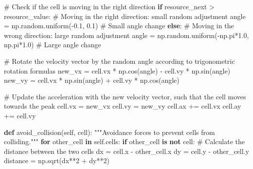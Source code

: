 \documentclass[
  letterpaper,
  DIV=11,
  numbers=noendperiod]{scrreprt}
\newenvironment{Shaded}{\begin{snugshade}}{\end{snugshade}}
\newcommand{\CommentTok}[1]{\textcolor[rgb]{0.37,0.37,0.37}{#1}}
\newcommand{\ControlFlowTok}[1]{\textcolor[rgb]{0.00,0.23,0.31}{\textbf{#1}}}
\newcommand{\DecValTok}[1]{\textcolor[rgb]{0.68,0.00,0.00}{#1}}
\newcommand{\FloatTok}[1]{\textcolor[rgb]{0.68,0.00,0.00}{#1}}
\newcommand{\KeywordTok}[1]{\textcolor[rgb]{0.00,0.23,0.31}{\textbf{#1}}}
\newcommand{\NormalTok}[1]{\textcolor[rgb]{0.00,0.23,0.31}{#1}}
\newcommand{\OperatorTok}[1]{\textcolor[rgb]{0.37,0.37,0.37}{#1}}
\newcommand{\VariableTok}[1]{\textcolor[rgb]{0.07,0.07,0.07}{#1}}
\theoremstyle{definition}
\theoremstyle{remark}
\begin{document}
\begin{tcolorbox}
\begin{Shaded}
\begin{Highlighting}[]
        \CommentTok{\# Check if the cell is moving in the right direction}
        \ControlFlowTok{if}\NormalTok{ resource\_next }\OperatorTok{\textgreater{}}\NormalTok{ resource\_value:}
            \CommentTok{\# Moving in the right direction: small random adjustment}
\NormalTok{            angle }\OperatorTok{=}\NormalTok{ np.random.uniform(}\OperatorTok{{-}}\FloatTok{0.1}\NormalTok{, }\FloatTok{0.1}\NormalTok{)  }\CommentTok{\# Small angle change}
        \ControlFlowTok{else}\NormalTok{:}
            \CommentTok{\# Moving in the wrong direction: large random adjustment}
\NormalTok{            angle }\OperatorTok{=}\NormalTok{ np.random.uniform(}\OperatorTok{{-}}\NormalTok{np.pi}\OperatorTok{*}\FloatTok{1.0}\NormalTok{, np.pi}\OperatorTok{*}\FloatTok{1.0}\NormalTok{)  }\CommentTok{\# Large angle change}
        
        \CommentTok{\# Rotate the velocity vector by the random angle according to trigonometric rotation formulas}
\NormalTok{        new\_vx }\OperatorTok{=}\NormalTok{ cell.vx }\OperatorTok{*}\NormalTok{ np.cos(angle) }\OperatorTok{{-}}\NormalTok{ cell.vy }\OperatorTok{*}\NormalTok{ np.sin(angle)}
\NormalTok{        new\_vy }\OperatorTok{=}\NormalTok{ cell.vx }\OperatorTok{*}\NormalTok{ np.sin(angle) }\OperatorTok{+}\NormalTok{ cell.vy }\OperatorTok{*}\NormalTok{ np.cos(angle)}

        \CommentTok{\# Update the acceleration with the new velocity vector, such that the cell moves towards the peak}
\NormalTok{        cell.vx }\OperatorTok{=}\NormalTok{ new\_vx}
\NormalTok{        cell.vy }\OperatorTok{=}\NormalTok{ new\_vy}
\NormalTok{        cell.ax }\OperatorTok{+=}\NormalTok{ cell.vx}
\NormalTok{        cell.ay }\OperatorTok{+=}\NormalTok{ cell.vy}
         
    
    \KeywordTok{def}\NormalTok{ avoid\_collision(}\VariableTok{self}\NormalTok{, cell):}
        \CommentTok{"""Avoidance forces to prevent cells from colliding."""}
        \ControlFlowTok{for}\NormalTok{ other\_cell }\KeywordTok{in} \VariableTok{self}\NormalTok{.cells:}
            \ControlFlowTok{if}\NormalTok{ other\_cell }\KeywordTok{is} \KeywordTok{not}\NormalTok{ cell:}
                \CommentTok{\# Calculate the distance between the two cells}
\NormalTok{                dx }\OperatorTok{=}\NormalTok{ cell.x }\OperatorTok{{-}}\NormalTok{ other\_cell.x}
\NormalTok{                dy }\OperatorTok{=}\NormalTok{ cell.y }\OperatorTok{{-}}\NormalTok{ other\_cell.y}
\NormalTok{                distance }\OperatorTok{=}\NormalTok{ np.sqrt(dx}\OperatorTok{**}\DecValTok{2} \OperatorTok{+}\NormalTok{ dy}\OperatorTok{**}\DecValTok{2}\NormalTok{)}


\end{Highlighting}
\end{Shaded}
\end{tcolorbox}
\end{document}
